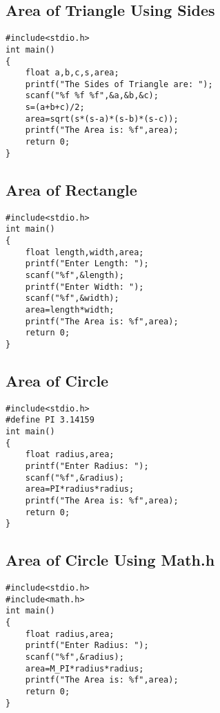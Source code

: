 \documentclass[a4paper,14pt]{article}
\begin{document}
\subsection{Area of Triangle Using Sides}
\vspace{0.5cm}
\begin{lstlisting}[caption={Area of Triangle Using Sides}]
#include<stdio.h>
int main()
{
    float a,b,c,s,area;
    printf("The Sides of Triangle are: ");
    scanf("%f %f %f",&a,&b,&c);
    s=(a+b+c)/2;
    area=sqrt(s*(s-a)*(s-b)*(s-c));
    printf("The Area is: %f",area);
    return 0;
}
\end{lstlisting}
\newpage

\subsection{Area of Rectangle}
\vspace{0.5cm}
\begin{lstlisting}[caption={Area of Rectangle}]
#include<stdio.h>
int main()
{
    float length,width,area;
    printf("Enter Length: ");
    scanf("%f",&length);
    printf("Enter Width: ");
    scanf("%f",&width);
    area=length*width;
    printf("The Area is: %f",area);   
    return 0;
}
\end{lstlisting}
\newpage

\subsection{Area of Circle}
\vspace{0.5cm}
\begin{lstlisting}[caption={Area of Circle}]
#include<stdio.h>
#define PI 3.14159
int main()
{
    float radius,area;
    printf("Enter Radius: ");
    scanf("%f",&radius);
    area=PI*radius*radius;
    printf("The Area is: %f",area);
    return 0;
}
\end{lstlisting}
\newpage

\subsection{Area of Circle Using Math.h}
\vspace{0.5cm}
\begin{lstlisting}[caption={Area of Circle Using Math.h}]
#include<stdio.h>
#include<math.h>
int main()
{
    float radius,area;
    printf("Enter Radius: ");
    scanf("%f",&radius);
    area=M_PI*radius*radius;
    printf("The Area is: %f",area);
    return 0;
}
\end{lstlisting}
\newpage
\end{document}
